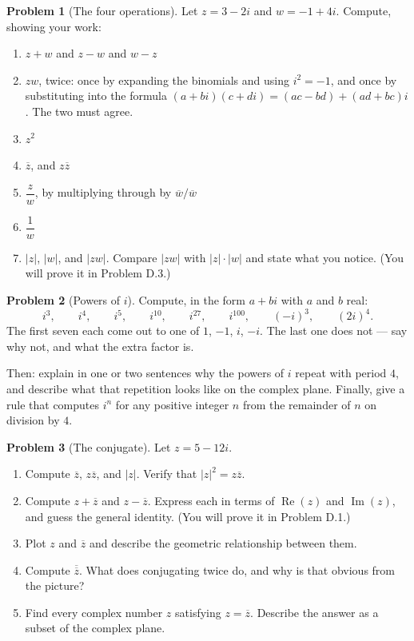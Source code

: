 \documentclass[11pt]{article}
\theoremstyle{definition}
\newtheorem{prob}{Problem}[section]
\newcommand{\conj}[1]{\overline{#1}}
\newcommand{\Rez}{\operatorname{Re}}
\newcommand{\Imz}{\operatorname{Im}}
\begin{document}
\begin{prob}[The four operations]
Let $z = 3-2i$ and $w=-1+4i$. Compute, showing your work:

\begin{enumerate}[label=\textbf{(\alph*)},leftmargin=2.6em,itemsep=7pt,topsep=6pt]
  \item $z+w$ \qquad and \qquad $z-w$ \qquad and \qquad $w-z$
  \item $zw$, twice: once by expanding the binomials and using $i^{2}=-1$, and
        once by substituting into the formula
        $(a+bi)(c+di)=(ac-bd)+(ad+bc)i$. The two must agree.
  \item $z^{2}$
  \item $\conj{z}$, and $z\conj{z}$
  \item $\dfrac{z}{w}$, by multiplying through by $\conj{w}/\conj{w}$
  \item $\dfrac{1}{w}$
  \item $\lvert z\rvert$, $\lvert w\rvert$, and $\lvert zw\rvert$.
        Compare $\lvert zw\rvert$ with $\lvert z\rvert\cdot\lvert w\rvert$ and
        state what you notice. (You will prove it in Problem D.3.)
\end{enumerate}
\end{prob}

\begin{prob}[Powers of $i$]
Compute, in the form $a+bi$ with $a$ and $b$ real:
\[
  i^{3},\qquad i^{4},\qquad i^{5},\qquad i^{10},\qquad i^{27},\qquad i^{100},
  \qquad (-i)^{3},\qquad (2i)^{4}.
\]
The first seven each come out to one of $1$, $-1$, $i$, $-i$. The last one does
not --- say why not, and what the extra factor is.

\noindent Then: explain in one or two sentences why the powers of $i$ repeat with
period $4$, and describe what that repetition looks like on the complex plane.
Finally, give a rule that computes $i^{n}$ for any positive integer $n$ from the
remainder of $n$ on division by $4$.
\end{prob}

\begin{prob}[The conjugate]
Let $z=5-12i$.

\begin{enumerate}[label=\textbf{(\alph*)},leftmargin=2.6em,itemsep=7pt,topsep=6pt]
  \item Compute $\conj{z}$, $z\conj{z}$, and $\lvert z\rvert$. Verify that
        $\lvert z\rvert^{2}=z\conj{z}$.
  \item Compute $z+\conj{z}$ and $z-\conj{z}$. Express each in terms of
        $\Rez(z)$ and $\Imz(z)$, and guess the general identity. (You will prove
        it in Problem D.1.)
  \item Plot $z$ and $\conj{z}$ and describe the geometric relationship between
        them.
  \item Compute $\conj{\conj{z}}$. What does conjugating twice do, and why is
        that obvious from the picture?
  \item Find every complex number $z$ satisfying $z=\conj{z}$. Describe the
        answer as a subset of the complex plane.
\end{enumerate}
\end{prob}
\end{document}
